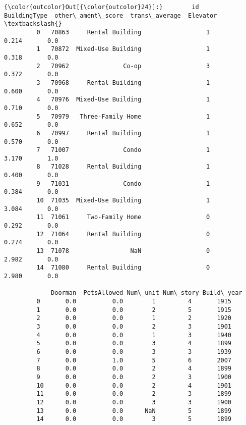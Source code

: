 \documentclass[11pt]{article}
\begin{document}
\begin{Verbatim}[commandchars=\\\{\}]
{\color{outcolor}Out[{\color{outcolor}24}]:}        id        BuildingType  other\_ament\_score  trans\_average  Elevator  \textbackslash{}
         0   70863     Rental Building                  1          0.214       0.0   
         1   70872  Mixed-Use Building                  1          0.318       0.0   
         2   70962               Co-op                  3          0.372       0.0   
         3   70968     Rental Building                  1          0.600       0.0   
         4   70976  Mixed-Use Building                  1          0.710       0.0   
         5   70979   Three-Family Home                  1          0.652       0.0   
         6   70997     Rental Building                  1          0.570       0.0   
         7   71007               Condo                  1          3.170       1.0   
         8   71028     Rental Building                  1          0.400       0.0   
         9   71031               Condo                  1          0.384       0.0   
         10  71035  Mixed-Use Building                  1          3.084       0.0   
         11  71061     Two-Family Home                  0          0.292       0.0   
         12  71064     Rental Building                  0          0.274       0.0   
         13  71078                 NaN                  0          2.982       0.0   
         14  71080     Rental Building                  0          2.980       0.0   
         
             Doorman  PetsAllowed Num\_unit Num\_story Build\_year  
         0       0.0          0.0        1         4       1915  
         1       0.0          0.0        2         5       1915  
         2       0.0          0.0        1         2       1920  
         3       0.0          0.0        2         3       1901  
         4       0.0          0.0        1         3       1940  
         5       0.0          0.0        3         4       1899  
         6       0.0          0.0        3         3       1939  
         7       0.0          1.0        5         6       2007  
         8       0.0          0.0        2         4       1899  
         9       0.0          0.0        2         3       1900  
         10      0.0          0.0        2         4       1901  
         11      0.0          0.0        2         3       1899  
         12      0.0          0.0        3         3       1900  
         13      0.0          0.0      NaN         5       1899  
         14      0.0          0.0        3         5       1899  
\end{Verbatim}
            
\end{document}
